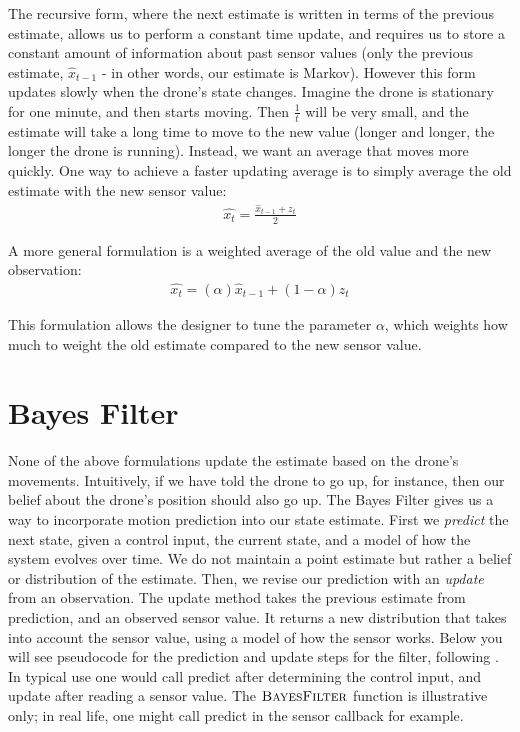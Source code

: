 \documentclass{article}
\begin{document}
\noindent The recursive form, where the next estimate is written in
terms of the previous estimate, allows us to perform a constant time
update, and requires us to store a constant amount of information
about past sensor values (only the previous estimate, $\hat{x}_{t-1}$
- in other words, our estimate is Markov).  However this form updates
slowly when the drone's state changes.  Imagine the drone is
stationary for one minute, and then starts moving.  Then $\frac{1}{t}$
will be very small, and the estimate will take a long time to move to
the new value (longer and longer, the longer the drone is running).
Instead, we want an average that moves more quickly.  One way to
achieve a faster updating average is to simply average the old
estimate with the new sensor value:
\begin{align}
\hat{x_t} = \frac{\hat{x}_{t-1} + z_t}{2}
\end{align}

\noindent A more general formulation is a weighted average of the old
value and the new observation:
\begin{align}
\hat{x_t} = (\alpha)\hat{x}_{t-1} + (1-\alpha)z_t
\end{align}

This formulation allows the designer to tune the parameter $\alpha$,
which weights how much to weight the old estimate compared to the new
sensor value.

\section{Bayes Filter}

None of the above formulations update the estimate based on the
drone's movements.  Intuitively, if we have told the drone to go up,
for instance, then our belief about the drone's position should also
go up. The Bayes Filter gives us a way to incorporate motion
prediction into our state estimate.  First we {\em predict} the next
state, given a control input, the current state, and a model of how
the system evolves over time.  We do not maintain a point estimate but
rather a belief or distribution of the estimate.  Then, we revise our
prediction with an {\em update} from an observation.  The update
method takes the previous estimate from prediction, and an observed
sensor value.  It returns a new distribution that takes into account
the sensor value, using a model of how the sensor works.  Below you
will see pseudocode for the prediction and update steps for the
filter, following \citet{thrun2005probabilistic}.  In typical use one
would call predict after determining the control input, and update
after reading a sensor value.  The $\textsc{BayesFilter}$ function is
illustrative only; in real life, one might call predict in the sensor
callback for example.
\end{document}
